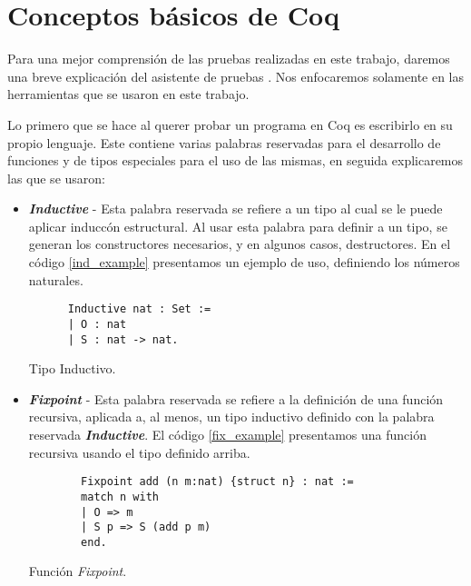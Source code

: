\appendix
\chapter{Conceptos básicos de {\sc Coq}}

Para una mejor comprensi\'on de las pruebas realizadas en este trabajo, daremos una breve explicación
del asistente de pruebas {\coq}. Nos enfocaremos solamente en las herramientas que se usaron en este
trabajo.

Lo primero que se hace al querer probar un programa en Coq es escribirlo en su propio lenguaje. Este
contiene varias palabras reservadas para el desarrollo de funciones y de tipos especiales para el uso
de las mismas, en seguida explicaremos las que se usaron:

\begin{itemize}
  \item \textbf{\textit{Inductive}} - Esta palabra reservada se refiere a un tipo al cual se le puede aplicar inducc\'on
    estructural. Al usar esta palabra para definir a un tipo, se generan los constructores necesarios, y en algunos casos,
    destructores\cite{IndAndRec}. En el c\'odigo \ref{ind_example} presentamos un ejemplo de uso, definiendo los 
    n\'umeros naturales.
    \begin{listing}[!ht]
    \centering
    \captionsetup{justification=centering}
    \begin{verbatim}
      Inductive nat : Set :=
      | O : nat
      | S : nat -> nat. 
    \end{verbatim}
    \caption{Tipo Inductivo.}
    \label{ind_example}
    \end{listing}
  \item \textbf{\textit{Fixpoint}} - Esta palabra reservada se refiere a la definici\'on de una funci\'on recursiva, aplicada a, al menos, 
    un tipo inductivo definido con la palabra reservada \textbf{\textit{Inductive}}\cite{IndAndRec}. El c\'odigo \ref{fix_example} presentamos una funci\'on recursiva usando el tipo definido arriba. 
    \begin{listing}[!ht]
      \centering
      \captionsetup{justification=centering}
      \begin{verbatim}
        Fixpoint add (n m:nat) {struct n} : nat :=
        match n with
        | O => m
        | S p => S (add p m)
        end. 
      \end{verbatim}
      \caption{Funci\'on \textit{Fixpoint}.}
      \label{fix_example}
      \end{listing}

\end{itemize}
